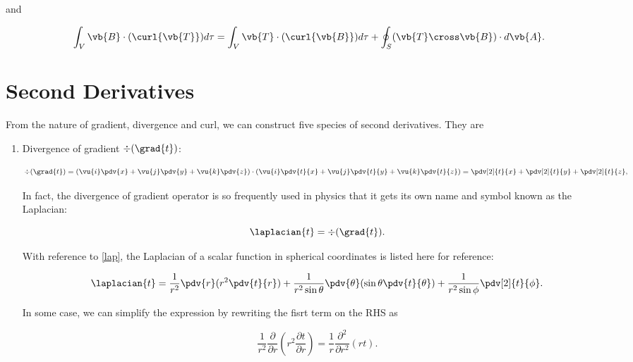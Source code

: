 \documentclass[english,a4paper,12pt]{report}
\begin{document}
and

\begin{equation} 
	\int_{V} \vb{B} \cdot (\curl{\vb{T}}) d\tau = \int_{V} \vb{T} \cdot (\curl{\vb{B}}) d\tau + \oint_{S} (\vb{T} \cross \vb{B}) \cdot d\vb{A}. 
\end{equation}
	
\section{Second Derivatives}
	
From the nature of gradient, divergence and curl, we can construct five species of second derivatives. They are 
\begin{enumerate}
	\item Divergence of gradient \(\div{(\grad{t})}\):
		
	\begin{equation} 
		\div{(\grad{t})} = \left(\vu{i}\pdv{x} + \vu{j}\pdv{y} + \vu{k}\pdv{z}\right) \cdot \left(\vu{i}\pdv{t}{x} + \vu{j}\pdv{t}{y} + \vu{k}\pdv{t}{z}\right) = \pdv[2]{t}{x} + \pdv[2]{t}{y} + \pdv[2]{t}{z}, \label{prelap} 
	\end{equation}
		
	In fact, the divergence of gradient operator is so frequently used in physics that it gets its own name and symbol known as the Laplacian:
		
	\begin{equation}
		\laplacian{t} = \div{(\grad{t})}. \label{lap} 
	\end{equation}
		
	With reference to \cref{lap}, the Laplacian of a scalar function in spherical coordinates is listed here for reference:
	
	\begin{equation} 
		\laplacian{t} = \frac{1}{r^2}\pdv{r}(r^2\pdv{t}{r}) + \frac{1}{r^2\sin{\theta}}\pdv{\theta}(\sin{\theta}\pdv{t}{\theta}) + \frac{1}{r^2\sin{\phi}}\pdv[2]{t}{\phi}. 
	\end{equation}

	In some case, we can simplify the expression by rewriting the fisrt term on the RHS as 

	\begin{equation}
		\frac{1}{r^2} \frac{\partial }{\partial r} \left( r^2 \frac{\partial t}{\partial r}  \right) = \frac{1}{r} \frac{\partial^2 }{\partial r^2} (rt).   
	\end{equation}
	
	
		

\end{enumerate}
\end{document}

